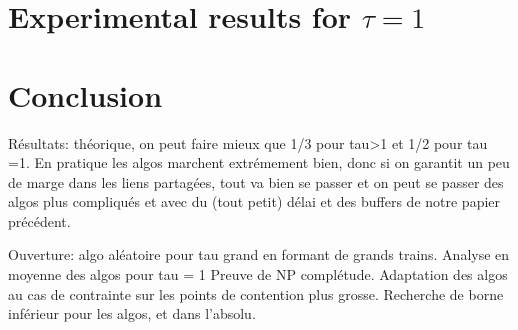 \documentclass[10pt, conference, letterpaper]{IEEEtran}
\begin{document}
\section{Experimental results for $\tau = 1$}


\section{Conclusion}

Résultats:  théorique, on peut faire mieux que 1/3 pour tau>1 et 1/2 pour tau =1.
En pratique les algos marchent extrémement bien, donc si on garantit un peu de marge
dans les liens partagées, tout va bien se passer et on peut se passer des algos plus compliqués 
et avec du (tout petit) délai et des buffers de notre papier précédent. 

Ouverture: algo aléatoire pour tau grand en formant de grands trains.
Analyse en moyenne des algos pour tau = 1
Preuve de NP complétude. Adaptation des algos au cas de contrainte sur les points de contention
plus grosse.
Recherche de borne inférieur pour les algos, et dans l'absolu.




 
\end{document}
